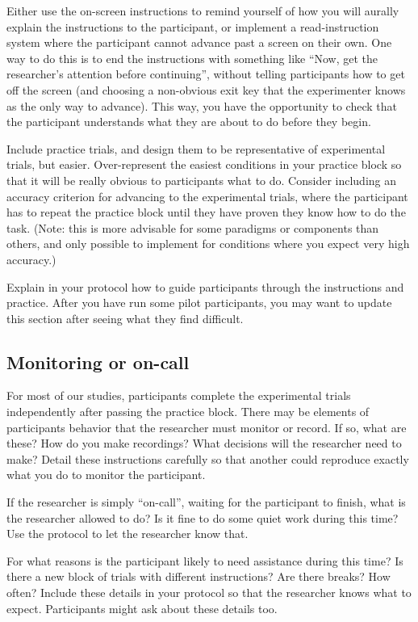 \documentclass[
  12pt,
]{book}
\begin{document}
Either use the on-screen instructions to remind yourself of how you will aurally explain the instructions to the participant, or implement a read-instruction system where the participant cannot advance past a screen on their own. One way to do this is to end the instructions with something like ``Now, get the researcher's attention before continuing'', without telling participants how to get off the screen (and choosing a non-obvious exit key that the experimenter knows as the only way to advance). This way, you have the opportunity to check that the participant understands what they are about to do before they begin.

Include practice trials, and design them to be representative of experimental trials, but easier. Over-represent the easiest conditions in your practice block so that it will be really obvious to participants what to do. Consider including an accuracy criterion for advancing to the experimental trials, where the participant has to repeat the practice block until they have proven they know how to do the task. (Note: this is more advisable for some paradigms or components than others, and only possible to implement for conditions where you expect very high accuracy.)

Explain in your protocol how to guide participants through the instructions and practice. After you have run some pilot participants, you may want to update this section after seeing what they find difficult.

\subsection{Monitoring or on-call}\label{monitoring-or-on-call}

For most of our studies, participants complete the experimental trials independently after passing the practice block. There may be elements of participants behavior that the researcher must monitor or record. If so, what are these? How do you make recordings? What decisions will the researcher need to make? Detail these instructions carefully so that another could reproduce exactly what you do to monitor the participant.

If the researcher is simply ``on-call'', waiting for the participant to finish, what is the researcher allowed to do? Is it fine to do some quiet work during this time? Use the protocol to let the researcher know that.

For what reasons is the participant likely to need assistance during this time? Is there a new block of trials with different instructions? Are there breaks? How often? Include these details in your protocol so that the researcher knows what to expect. Participants might ask about these details too.
\end{document}
